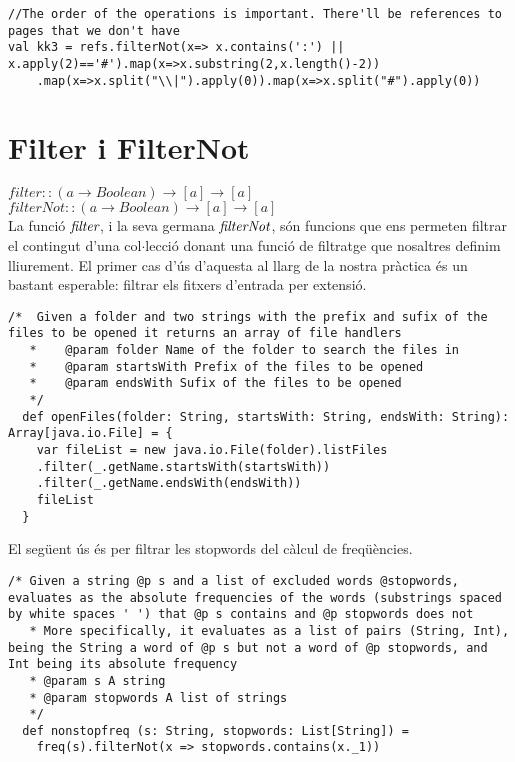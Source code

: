 \documentclass{report}
\begin{document}
\begin{lstlisting}[style=scalaHighlight]
//The order of the operations is important. There'll be references to pages that we don't have
val kk3 = refs.filterNot(x=> x.contains(':') || x.apply(2)=='#').map(x=>x.substring(2,x.length()-2))
    .map(x=>x.split("\\|").apply(0)).map(x=>x.split("#").apply(0))
\end{lstlisting}

\newpage

\section{Filter i FilterNot}

$ filter :: (a \rightarrow Boolean) \rightarrow [a] \rightarrow [a] $ \\
$ filterNot :: (a \rightarrow Boolean) \rightarrow [a] \rightarrow [a] $ \\

La funció $ \emph{filter} $, i la seva germana $ \emph{filterNot} $, són funcions que ens permeten filtrar el contingut d'una col$\cdot$lecció donant una funció de filtratge que nosaltres definim lliurement. El primer cas d'ús d'aquesta al llarg de la nostra pràctica és un bastant esperable: filtrar els fitxers d'entrada per extensió.

\begin{lstlisting}[style=scalaHighlight]
/*	Given a folder and two strings with the prefix and sufix of the files to be opened it returns an array of file handlers
   * 	@param folder Name of the folder to search the files in
   * 	@param startsWith Prefix of the files to be opened
   * 	@param endsWith Sufix of the files to be opened
   */
  def openFiles(folder: String, startsWith: String, endsWith: String): Array[java.io.File] = {
    var fileList = new java.io.File(folder).listFiles
    .filter(_.getName.startsWith(startsWith))
    .filter(_.getName.endsWith(endsWith))
    fileList
  }
\end{lstlisting}

El següent ús és per filtrar les stopwords del càlcul de freqüències.

\begin{lstlisting}[style=scalaHighlight]
/* Given a string @p s and a list of excluded words @stopwords, evaluates as the absolute frequencies of the words (substrings spaced by white spaces ' ') that @p s contains and @p stopwords does not
   * More specifically, it evaluates as a list of pairs (String, Int), being the String a word of @p s but not a word of @p stopwords, and Int being its absolute frequency
   * @param s A string
   * @param stopwords A list of strings
   */
  def nonstopfreq (s: String, stopwords: List[String]) =
    freq(s).filterNot(x => stopwords.contains(x._1))
\end{lstlisting}
\end{document}

